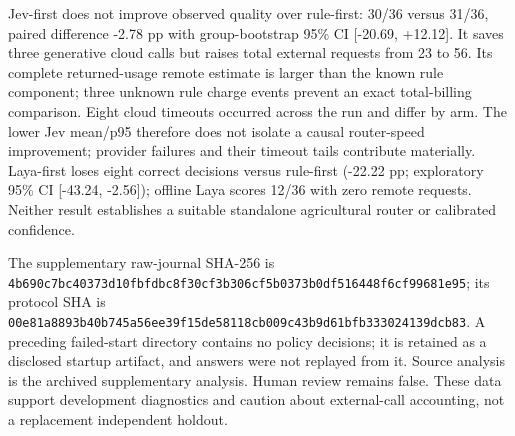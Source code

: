 \documentclass[10pt,a4paper,twocolumn]{article}
\begin{document}
\begin{table}[t]
\centering\small
\caption{Supplementary observed DEV comparison: 36 cases per arm, not a new confirmatory test. Remote cost column gives known USD plus the number of unknown charge events; these are not an invoice.}
\end{table}


Jev-first does not improve observed quality over rule-first: 30/36 versus 31/36, paired difference -2.78 pp with group-bootstrap 95\% CI [-20.69, +12.12]. It saves three generative cloud calls but raises total external requests from 23 to 56. Its complete returned-usage remote estimate is larger than the known rule component; three unknown rule charge events prevent an exact total-billing comparison. Eight cloud timeouts occurred across the run and differ by arm. The lower Jev mean/p95 therefore does not isolate a causal router-speed improvement; provider failures and their timeout tails contribute materially. Laya-first loses eight correct decisions versus rule-first (-22.22 pp; exploratory 95\% CI [-43.24, -2.56]); offline Laya scores 12/36 with zero remote requests. Neither result establishes a suitable standalone agricultural router or calibrated confidence.

The supplementary raw-journal SHA-256 is {\small\texttt{4b690c7b\allowbreak{}c40373d1\allowbreak{}0fbfdbc8\allowbreak{}f30cf3b3\allowbreak{}06cf5b03\allowbreak{}73b0df51\allowbreak{}6448f6cf\allowbreak{}99681e95}}; its protocol SHA is {\small\texttt{00e81a88\allowbreak{}93b40b74\allowbreak{}5a56ee39\allowbreak{}f15de581\allowbreak{}18cb009c\allowbreak{}43b9d61b\allowbreak{}fb333024\allowbreak{}139dcb83}}. A preceding failed-start directory contains no policy decisions; it is retained as a disclosed startup artifact, and answers were not replayed from it. Source analysis is the archived supplementary analysis. Human review remains false. These data support development diagnostics and caution about external-call accounting, not a replacement independent holdout.
\end{document}
